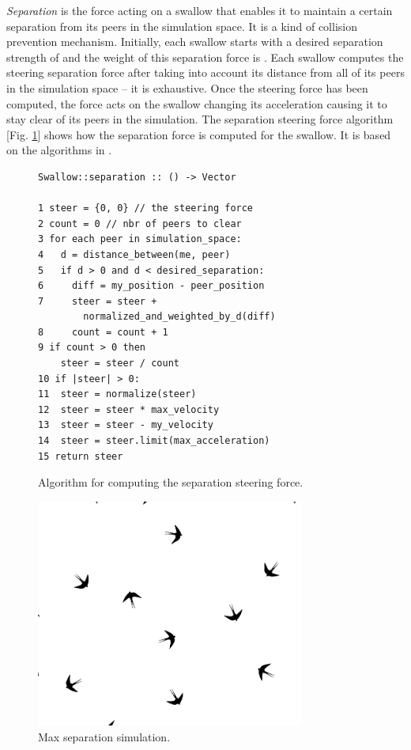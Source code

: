 \documentclass[../main]{subfiles}
\begin{document}
{\em Separation} is the force acting on a swallow that enables it to maintain a certain separation from its peers in the simulation space. It is a kind of collision prevention mechanism. Initially, each swallow starts with a desired separation strength of  and the weight of this separation force is . Each swallow computes the steering separation force after taking into account its distance from all of its peers in the simulation space -- it is exhaustive. Once the steering force has been computed, the force acts on the swallow changing its acceleration causing it to stay clear of its peers in the simulation. The separation steering force algorithm [Fig. \ref{separationLogic}] shows how the separation force is computed for the swallow. It is based on the algorithms in \cite{reynolds1999steering, danshiffman}.

\begin{figure}
	\begin{verbatim}
Swallow::separation :: () -> Vector

1 steer = {0, 0} // the steering force
2 count = 0 // nbr of peers to clear
3 for each peer in simulation_space:
4   d = distance_between(me, peer)
5   if d > 0 and d < desired_separation:
6     diff = my_position - peer_position
7     steer = steer + 
        normalized_and_weighted_by_d(diff)
8     count = count + 1
9 if count > 0 then
    steer = steer / count
10 if |steer| > 0:
11  steer = normalize(steer)
12  steer = steer * max_velocity
13  steer = steer - my_velocity
14  steer = steer.limit(max_acceleration)
15 return steer
    \end{verbatim}
	\caption{Algorithm for computing the separation steering force.}
	\label{separationLogic}
\end{figure}

\begin{figure}
    \centering
	\includegraphics[scale=0.30, width=250pt, frame]{resources/flocker_max_separation.png}
	\caption{Max separation simulation.}
	\label{maxSeparationImg}
\end{figure}
\end{document}
